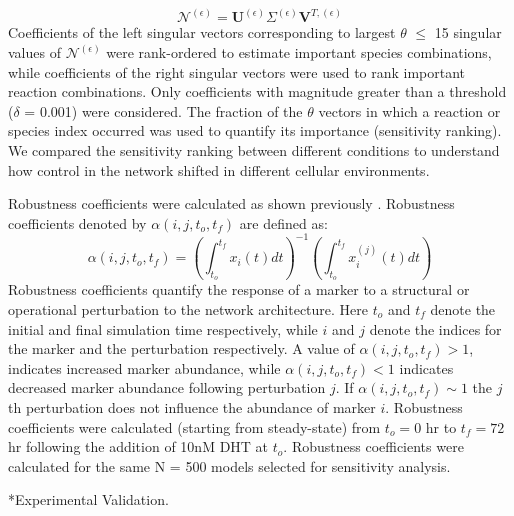 \documentclass[12pt]{article}
\makeatletter
\renewcommand\subsection{\@startsection
	{subsection}{2}{0mm}
	{-0.05in}
	{-0.5\baselineskip}
	{\normalfont\normalsize\bfseries}}
\makeatother
\begin{document}
\begin{equation}
	\mathcal{N}^{\left(\epsilon\right)} = \mathbf{U}^{\left(\epsilon\right)}\Sigma^{\left(\epsilon\right)}\mathbf{V}^{T,{\left(\epsilon\right)}}
\end{equation}
Coefficients of the left singular vectors corresponding to largest $\theta$ $\leq$ 15 singular values of $\mathcal{N}^{\left(\epsilon\right)}$ were rank-ordered to estimate important species combinations, while coefficients of the right singular vectors were used to rank important reaction combinations. 
Only coefficients with magnitude greater than a threshold ($\delta$ = 0.001) were considered. 
The fraction of the $\theta$ vectors in which a reaction or species index occurred was used to quantify its importance (sensitivity ranking). 
We compared the sensitivity ranking between different conditions to understand how control in the network shifted in different cellular environments.  

Robustness coefficients were calculated as shown previously \cite{Tasseff2011}. 
Robustness coefficients denoted by $\alpha\left(i,j,t_{o},t_{f}\right)$ are defined as:
\begin{equation}
\alpha\left(i,j,t_{o},t_{f}\right)=\left(\displaystyle\int_{t_{o}}^{t_{f}}x_{i}\left(t\right)dt\right)^{-1}\left(\displaystyle\int_{t_{o}}^{t_{f}}x^{(j)}_{i}\left(t\right)dt\right)
\end{equation}
Robustness coefficients quantify the response of a marker to a structural or operational perturbation to the network architecture.
Here $t_o$ and $t_f$ denote the initial and final simulation time respectively, while $i$ and $j$ denote the indices for the marker and the perturbation respectively. 
A value of $\alpha\left(i,j,t_{o},t_{f}\right)>1$, indicates increased marker abundance, while $\alpha\left(i,j,t_{o},t_{f}\right)<1$ indicates decreased marker abundance following perturbation $j$. 
If $\alpha\left(i,j,t_{o},t_{f}\right)\sim{1}$ the $j$th perturbation does not influence the abundance of marker $i$.
Robustness coefficients were calculated (starting from steady-state) from $t_{o} = 0$ hr to $t_{f} = 72$ hr following the addition of 10nM DHT at $t_{o}$.
Robustness coefficients were calculated for the same N = 500 models selected for sensitivity analysis. 

\subsection*{Experimental Validation.}
\end{document}
